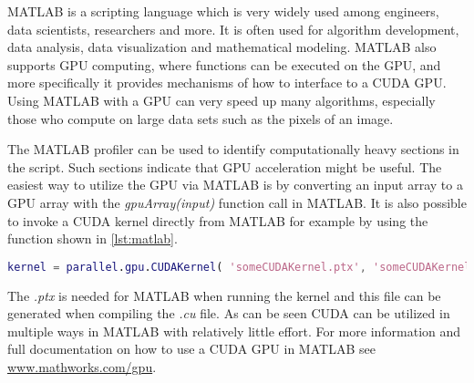 MATLAB is a scripting language which is very widely used among engineers, data scientists, researchers and more.
It is often used for algorithm development, data analysis, data visualization and mathematical modeling.
MATLAB also supports GPU computing, where functions can be executed on the GPU, and more specifically it provides mechanisms of how to interface to a CUDA GPU.
Using MATLAB with a GPU can very speed up many algorithms, especially those who compute on large data sets such as the pixels of an image.

The MATLAB profiler can be used to identify computationally heavy sections in the script. 
Such sections indicate that GPU acceleration might be useful.
The easiest way to utilize the GPU via MATLAB is by converting an input array to a GPU array with the \textit{gpuArray(input)} function call in MATLAB.
It is also possible to invoke a CUDA kernel directly from MATLAB for example by using the function shown in \autoref{lst:matlab}.
\begin{lstlisting}[language=matlab,caption={Invoking CUDA kernel in MATLAB},label=lst:matlab]
	kernel = parallel.gpu.CUDAKernel( 'someCUDAKernel.ptx', 'someCUDAKernel.cu' );
\end{lstlisting}
The \textit{.ptx} is needed for MATLAB when running the kernel and this file can be generated when compiling the \textit{.cu} file.
As can be seen CUDA can be utilized in multiple ways in MATLAB with relatively little effort.
For more information and full documentation on how to use a CUDA GPU in MATLAB see \url{www.mathworks.com/gpu}.